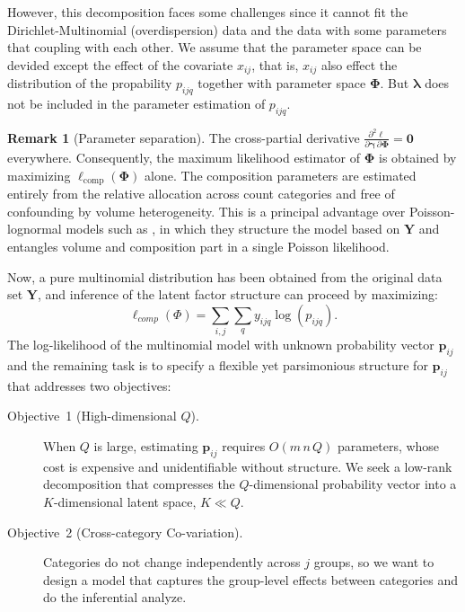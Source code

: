 \documentclass[]{report}
\theoremstyle{definition}
\newtheorem{remark}{Remark}
\begin{document}
However, this decomposition faces some challenges since it cannot fit the Dirichlet-Multinomial (overdispersion) data and the data with some parameters that coupling with each other. We assume that the parameter space can be devided except the effect of the covariate $x_{ij}$, that is, $x_{ij}$ also effect the distribution of the propability $p_{ijq}$ together with parameter space $\bm{\Phi}$. But $\bm{\lambda}$ does not be included in the parameter estimation of $p_{ijq}$.
    \begin{remark}[Parameter separation]
\label{rem:separation}
The cross-partial derivative $\frac{\partial^2\ell}{\partial\bm{\gamma}\,\partial\bm{\Phi}}=\bm{0}$ everywhere. Consequently, the maximum likelihood estimator of $\bm{\Phi}$ is obtained by maximizing $\ell_{\mathrm{comp}}(\bm{\Phi})$ alone. The composition parameters are estimated entirely from the relative allocation across count categories and free of confounding by volume heterogeneity. This is a principal advantage over Poisson-lognormal models such as \cite{chiquet2018variational}, in which they structure the model based on $\bm{Y}$ and entangles volume and composition part in a single Poisson likelihood.
\end{remark}
Now, a pure multinomial distribution has been obtained from the original data set $\bm{Y}$, and inference of the latent factor structure can proceed by maximizing:
\begin{equation}
    \ell_{comp}(\Phi)=\sum_{i,j}\sum_{q} y_{ijq}\log (p_{ijq}).
    \label{eq:complink}
\end{equation}
The log-likelihood of the multinomial model with unknown probability vector $\bm{p}_{ij}$ and the remaining task is to specify a flexible yet parsimonious structure for $\bm{p}_{ij}$ that addresses two objectives:
\begin{description}
\item[Objective~1 (High-dimensional $Q$).] When $Q$ is large,  estimating $\bm{p}_{ij}$ requires $O(m\,n\,Q)$ parameters, whose cost is expensive and unidentifiable without structure. We seek a low-rank decomposition that compresses the $Q$-dimensional probability vector into a $K$-dimensional latent space, $K\ll Q$.
\item[Objective~2 (Cross-category Co-variation).] Categories do not change independently across $j$ groups, so we want to design a model that captures the group-level effects between categories and do the inferential analyze.
\end{description}
\end{document}

